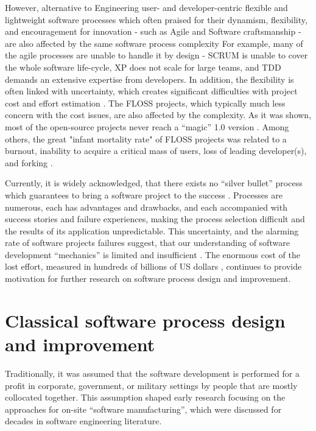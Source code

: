 However, alternative to Engineering user- and developer-centric flexible and lightweight software 
processes which often praised for their dynamism, flexibility, and encouragement for innovation -
such as Agile and Software craftsmanship - are also affected by the same software process complexity 
For example, many of the agile processes are unable to handle it by design - SCRUM is unable to cover 
the whole software life-cycle, XP does not scale for large teams, and TDD demands an extensive expertise 
from developers. In addition, the flexibility is often linked with uncertainty, which creates significant 
difficulties with project cost and effort estimation \cite{citeulike:12933080} \cite{citeulike:9928907}.
The FLOSS projects, which typically much less concern with the cost issues, are also affected by the complexity.
As it was shown, most of the open-source projects never reach a ``magic'' 1.0 version \cite{citeulike:12480029}. 
Among others, the great "infant mortality rate" of FLOSS projects was related to a burnout, 
inability to acquire a critical mass of users, loss of leading developer(s), 
and forking \cite{richter2007critique}. 

Currently, it is widely acknowledged, that there exists no ``silver bullet'' process which 
guarantees to bring a software project to the success \cite{citeulike:1986013}. 
Processes are numerous, each has advantages and drawbacks, and each accompanied with 
success stories and failure experiences, making the process selection difficult 
and the results of its application unpredictable.
This uncertainty, and the alarming rate of software projects failures suggest, that our understanding 
of software development ``mechanics'' is limited and insufficient \cite{citeulike:12550665}. 
The enormous cost of the lost effort, measured in hundreds of billions of US dollars 
\cite{citeulike:2207657} \cite{citeulike:2207653} \cite{citeulike:2207655}, 
continues to provide motivation for further research on software process design and improvement. 

%
%
\section{Classical software process design and improvement}\label{section_software_process_design}
Traditionally, it was assumed that the software development is performed for a profit in 
corporate, government, or military settings by people that are mostly collocated together. 
This assumption shaped early research focusing on the approaches for on-site ``software manufacturing'',
which were discussed for decades in software engineering literature. 

